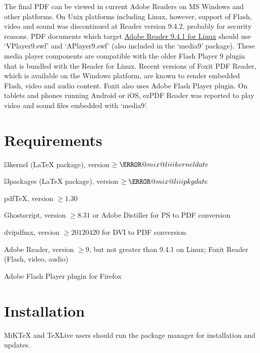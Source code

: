 \documentclass[a4paper]{article}
\begin{document}
The final PDF can be viewed in current Adobe Readers on MS Windows and other platforms. On Unix platforms including Linux, however, support of Flash, video and sound was discontinued at Reader version 9.4.2, probably for security reasons. PDF documents which target \href{ftp://ftp.adobe.com/pub/adobe/reader/unix/9.x/9.4.1/}{Adobe Reader 9.4.1 for Linux} should use `VPlayer9.swf' and `APlayer9.swf' (also included in the `media9' package). These media player components are compatible with the older Flash Player 9 plugin that is bundled with the Reader for Linux. Recent versions of Foxit PDF Reader, which is available on the Windows platform, are known to render embedded Flash, video and audio content. Foxit also uses Adobe Flash Player plugin. On tablets and phones running Android or iOS, ezPDF Reader was reported to play video and sound files embedded with `media9'.

\section{Requirements}
\begin{trivlist}
\makeatletter
\item l3kernel (\LaTeX{} package), version $\ge \g@mix@liiikerneldate$
\item l3packages (\LaTeX{} package), version $\ge \g@mix@liiipkgdate$
\makeatother
\item pdf\TeX{}, version $\ge1.30$
\item Ghostscript, version $\ge8.31$ or Adobe Distiller for PS to PDF conversion
\item dvipdfmx, version $\ge 20120420$ for DVI to PDF conversion
\item Adobe Reader, version $\ge9$, but not greater than 9.4.1 on Linux; Foxit Reader (Flash, video, audio)
\item Adobe Flash Player plugin for Firefox
\end{trivlist}

\section{Installation}
MiK\TeX{} and \TeX{}Live users should run the package manager for installation and updates.
\end{document}
